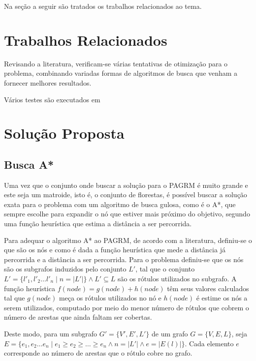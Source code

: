 \documentclass[12pt]{article}
\begin{document}
	Na seção a seguir são tratados os trabalhos relacionados ao tema.

\section{Trabalhos Relacionados}\label{sec:trabalhosRelacionados}

	Revisando a literatura, verificam-se várias tentativas de otimização para o problema, combinando variadas formas de algoritmos de busca que venham a fornecer melhores resultados.

	Vários testes são executados em \cite{consoli:2009}

\section{Solução Proposta}\label{sec:solucao}

	\subsection{Busca A*}\label{sec:aestrela}

		Uma vez que o conjunto onde buscar a solução para o PAGRM é muito grande e este seja um matroide, isto é, o conjunto de florestas, é possível buscar a solução exata para o problema com um algoritmo de busca gulosa, como é o A*, que sempre escolhe para expandir o nó que estiver mais próximo do objetivo, segundo uma função heurística que estima a distância a ser percorrida.

		Para adequar o algoritmo A* ao PAGRM, de acordo com a literatura, definiu-se o que são os nós e como é dada a função heurística que mede a distância já percorrida e a distância a ser percorrida. Para o problema definiu-se que os nós são os subgrafos induzidos pelo conjunto $L'$, tal que o conjunto $L' = \{l'_1, l'_2 \dots l'_n \mid n = |L'|\} \wedge L' \subseteq L$ são os rótulos utilizados no subgrafo. A função heurística $f(node) = g(node) + h(node)$ têm seus valores calculados tal que $g(node)$ meça os rótulos utilizados no nó e $h(node)$ é estime os nós a serem utilizados, computado por meio do menor número de rótulos que cobrem o número de arestas que ainda faltam ser cobertas.

		Deste modo, para um subgrafo $G' = \{V', E', L'\}$ de um grafo $G = \{V, E, L\}$, seja $E = \{e_1, e_2 \dots e_n \mid e_1 \geq e_2 \geq \dots \geq e_n \wedge n = |L'| \wedge e = |E(l)|\}$. Cada elemento $e$ corresponde ao número de arestas que o rótulo cobre no grafo.
\end{document}
